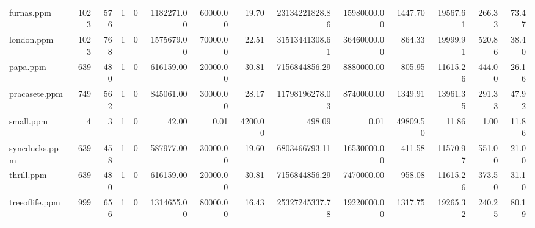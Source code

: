 \begin{landscape}
\begin{tabular}{|l||r|r|r|r||r|r|r||r|r|r||r|r|r|}
furnas.ppm & 1023 & 576 & 1 & 0 & 1182271.00 & 60000.00 & 19.70 & 23134221828.86 & 15980000.00 & 1447.70 & 19567.61 & 266.33 & 73.47 \\
london.ppm & 1023 & 768 & 1 & 0 & 1575679.00 & 70000.00 & 22.51 & 31513441308.61 & 36460000.00 & 864.33 & 19999.91 & 520.86 & 38.40 \\
papa.ppm & 639 & 480 & 1 & 0 & 616159.00 & 20000.00 & 30.81 & 7156844856.29 & 8880000.00 & 805.95 & 11615.26 & 444.00 & 26.16 \\
pracasete.ppm & 749 & 562 & 1 & 0 & 845061.00 & 30000.00 & 28.17 & 11798196278.03 & 8740000.00 & 1349.91 & 13961.35 & 291.33 & 47.92 \\
small.ppm & 4 & 3 & 1 & 0 & 42.00 & 0.01 & 4200.00 & 498.09 & 0.01 & 49809.50 & 11.86 & 1.00 & 11.86 \\
syncducks.ppm & 639 & 458 & 1 & 0 & 587977.00 & 30000.00 & 19.60 & 6803466793.11 & 16530000.00 & 411.58 & 11570.97 & 551.00 & 21.00  \\
thrill.ppm & 639 & 480 & 1 & 0 & 616159.00 & 20000.00 & 30.81 & 7156844856.29 & 7470000.00 & 958.08 & 11615.26 & 373.50 & 31.10 \\
treeoflife.ppm & 999 & 656 & 1 & 0 & 1314655.00 & 80000.00 & 16.43 & 25327245337.78 & 19220000.00 & 1317.75 & 19265.32 & 240.25 & 80.19 \\
\hline
\end{tabular}
\end{landscape}
